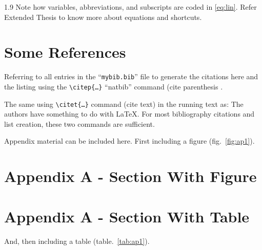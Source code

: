 \documentclass[ms-thesis,12pt,mathdesign]{ndsu-thesis-2022}
\newcommand\myspacing{1.9} %
\begin{document}
\begin{spacing}{\myspacing}
Note how variables, abbreviations, and subscripts are coded in \cref{eq:lin}. Refer Extended Thesis to know more about equations and shortcuts. 

\section{Some References}
Referring to all entries in the ``\texttt{mybib.bib}'' file to generate the citations here and the listing using the \texttt{\textbackslash citep\{\ldots\}} ``natbib'' command (cite parenthesis \citep{texbook,lcompanion,latex2e,knuth1984,lesk1977,amsthm2017,calvo2004using,cannayen2011latex,kopka2004guide,notso2021,bari2016identification}.

The same using \texttt{\textbackslash citet\{\ldots\}} command (cite text) in the running text as: The authors \citet{texbook,lcompanion,latex2e,knuth1984,lesk1977,amsthm2017,calvo2004using,cannayen2011latex,kopka2004guide,notso2021,bari2016identification} have something to do with \LaTeX. For most bibliography citations and list creation, these two commands are sufficient.

\makerefs %


Appendix material can be included here. First including a figure (fig.~\ref{fig:ap1}).

\section{Appendix A - Section With Figure}
	\kant[8]

\section{Appendix A - Section With Table}
And, then including a table (table.~\ref{tab:ap1}).


\end{spacing}
\end{document}
